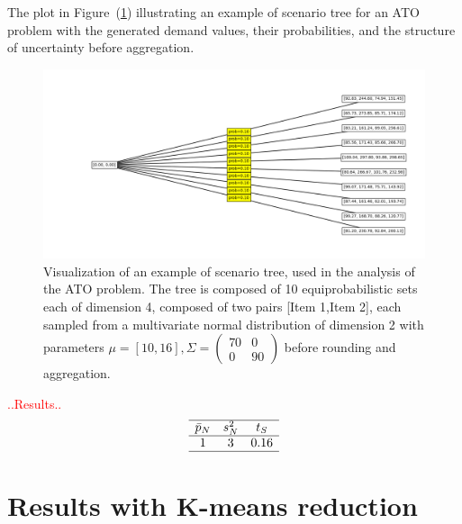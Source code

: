 \documentclass[a4paper,12pt]{article}
\begin{document}
	
	\noindent The plot in Figure~(\ref{fig:ato-scenariotree}) illustrating an example of scenario tree for an ATO problem  with the generated demand values, their probabilities, and the structure of uncertainty before aggregation.
	
	\begin{figure}[htbp]
		\centering
		\includegraphics[width=1\textwidth]{../immagini/scenariATO.png}
		\caption{Visualization of an example of scenario tree, used in the analysis of the ATO problem. The tree is composed of 10 equiprobabilistic sets each of dimension 4, composed of two pairs [Item 1,Item 2], each sampled from a multivariate normal distribution of dimension 2 with parameters $\mu = [10,16], \Sigma = \begin{pmatrix} 70 &0  \\ 0 &90  \end{pmatrix}$ before rounding and aggregation.}
		\label{fig:ato-scenariotree}
	\end{figure}
	
	\textcolor{red}{..Results..}
	\[
	\begin{array}{ccc}
		\hline
		\text{$\bar{p}_{N}$} & \text{$s_{N}^{2}$} & \text{$t_{S}$}\\
		\hline
		1 & 3 & 0.16 \\
		\hline
	\end{array}
	\]
	
	\label{tab:ATO-results-stat}
	
	\newpage
	\section{Results with K-means reduction}
	
\end{document}
